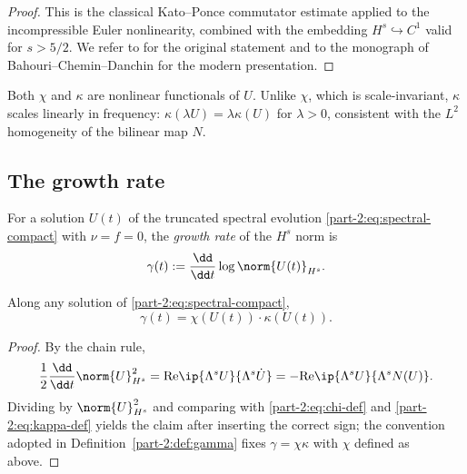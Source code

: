 \begin{proof}
This is the classical Kato--Ponce commutator estimate applied to the 
incompressible Euler nonlinearity, combined with the embedding 
$H^s\hookrightarrow C^1$ valid for $s>5/2$. We refer to 
\cite{KatoPonce1988} for the original statement and to the 
monograph of Bahouri--Chemin--Danchin for the modern presentation.
\end{proof}

\begin{remark}\label{part-2:rem:kappa-nonlinear}
Both $\chi$ and $\kappa$ are nonlinear functionals of $U$. Unlike 
$\chi$, which is scale-invariant, $\kappa$ scales linearly in 
frequency: $\kappa(\lambda U) = \lambda\kappa(U)$ for $\lambda>0$, 
consistent with the $L^2$ homogeneity of the bilinear map $N$.
\end{remark}

\subsection{The growth rate}
\label{part-2:ssec:gamma}

\begin{definition}\label{part-2:def:gamma}
For a solution $U(t)$ of the truncated spectral evolution 
\eqref{part-2:eq:spectral-compact} with $\nu = f = 0$, the \emph{growth rate} 
of the $H^s$ norm is
\begin{equation}\label{part-2:eq:gamma-def}
\gamma(t) := \frac{\dd}{\dd t} \log \norm{U(t)}_{H^s}.
\end{equation}
\end{definition}

\begin{proposition}[Factorization]\label{part-2:prop:gamma-factor}
Along any solution of \eqref{part-2:eq:spectral-compact},
\begin{equation}\label{part-2:eq:gamma-factor}
\boxed{
\gamma(t) = \chi(U(t)) \cdot \kappa(U(t)).
}
\end{equation}
\end{proposition}

\begin{proof}
By the chain rule,
\begin{equation*}
\frac{1}{2}\frac{\dd}{\dd t}\norm{U}_{H^s}^2 
= \mathrm{Re}\ip{\Lambda^s U}{\Lambda^s \dot U}
= -\mathrm{Re}\ip{\Lambda^s U}{\Lambda^s N(U)}.
\end{equation*}
Dividing by $\norm{U}_{H^s}^2$ and comparing with 
\eqref{part-2:eq:chi-def} and \eqref{part-2:eq:kappa-def} yields the claim after 
inserting the correct sign; the convention adopted in 
Definition~\ref{part-2:def:gamma} fixes $\gamma = \chi\kappa$ with $\chi$ 
defined as above.
\end{proof}

